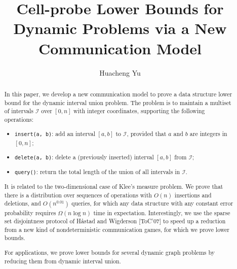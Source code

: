\documentclass[11pt]{article}
\begin{document}
\newtheorem{theorem}{Theorem}
\newtheorem{innercustomthm}{Theorem}
\newenvironment{customthm}[1]
  {\renewcommand\theinnercustomthm{#1}\innercustomthm}
  {\endinnercustomthm}
\newtheorem{proposition}{Proposition}
\newtheorem{corollary}{Corollary}
\newtheorem{innercustomcor}{Corollary}
\newenvironment{customcor}[1]
  {\renewcommand\theinnercustomcor{#1}\innercustomcor}
  {\endinnercustomcor}
\newtheorem{lemma}{Lemma}
\newtheorem{claim}{Claim}
\newtheorem{definition}{Definition}
\newtheorem*{remark}{Remark}
\newcommand{\diu}{dynamic interval union}
\newcommand{\bps}{batch partial sum}
\newcommand{\es}{evenly-spreading}
\newcommand{\mi}{multi-index}
\newcommand{\mm}{model $\mathcal{M}$}
\newcommand{\E}{\ensuremath{\mathop{\mathbb{E}}}}
\newcommand{\rev}{\ensuremath{\mathrm{rev}}}

\title{Cell-probe Lower Bounds for Dynamic Problems via a New Communication Model}
\author{Huacheng Yu}
\date{}

\maketitle

\begin{abstract}
In this paper, we develop a new communication model to prove a data structure lower bound for the \diu{} problem. The problem is to maintain a multiset of intervals $\mathcal{I}$ over $[0, n]$ with integer coordinates, supporting the following operations:
\begin{itemize}
	\item
		\verb+insert(a, b)+: add an interval $[a, b]$ to $\mathcal{I}$, provided that $a$ and $b$ are integers in $[0, n]$;
	\item
		\verb+delete(a, b)+: delete a (previously inserted) interval $[a, b]$ from $\mathcal{I}$;
	\item
		\verb+query()+: return the total length of the union of all intervals in $\mathcal{I}$.
\end{itemize}

It is related to the two-dimensional case of Klee's measure problem. We prove that there is a distribution over sequences of operations with $O(n)$ insertions and deletions, and $O(n^{0.01})$ queries, for which any data structure with any constant error probability requires $\Omega(n\log n)$ time in expectation. Interestingly, we use the sparse set disjointness protocol of H\aa{}stad and Wigderson [ToC'07] to speed up a reduction from a new kind of nondeterministic communication games, for which we prove lower bounds.

For applications, we prove lower bounds for several dynamic graph problems by reducing them from \diu{}.
\end{abstract}
\end{document}
